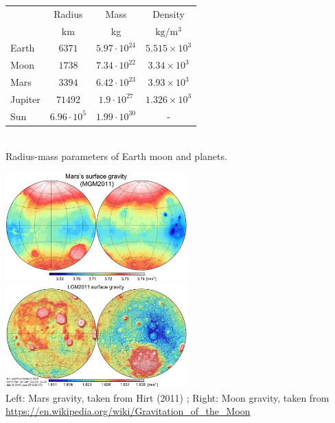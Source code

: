 \begin{center}
  \begin{tabular}{|l|c|c|c|} \hline
               & Radius & Mass & Density \\ 
               & km   & kg & $\mathrm{kg/m^3}$\\ \hline
     Earth   & $6371$ & $5.97 \cdot 10^{24}$ & $5.515 \times 10^3$ \\
     Moon    & $1738$ & $7.34 \cdot 10^{22}$ & $3.34  \times 10^3$ \\ 
     Mars    & $3394$ & $6.42 \cdot 10^{23}$ & $3.93  \times 10^3$ \\
     Jupiter &$71492$ & $1.9  \cdot 10^{27}$ & $1.326 \times 10^3$ \\
     Sun     &$6.96\cdot 10^5$ 
                      & $1.99 \cdot 10^{30}$ &        -            \\
  \hline
  \end{tabular} \\
{ \captionfont Radius-mass parameters of Earth moon and planets.}
\end{center}


\begin{center}
\includegraphics[width=7cm]{images/gravity/marsgravity}
\includegraphics[width=7cm]{images/gravity/moongravity}\\
{\captionfont Left: Mars gravity, taken from Hirt \etal (2011) \cite{hick12}; 
Right: Moon gravity, taken from \url{https://en.wikipedia.org/wiki/Gravitation_of_the_Moon}}
\end{center}


